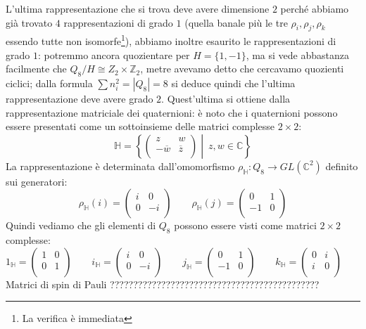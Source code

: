 \documentclass[11pt]{article}
\theoremstyle{plain}
\theoremstyle{definition}
\theoremstyle{remark}
\newcommand{\C}{\mathbb{C}}
\newcommand{\Z}{\mathbb{Z}}
\newcommand{\HH}{\mathbb{H}}
\begin{document}
L'ultima rappresentazione che si trova deve avere dimensione $2$ perché abbiamo già trovato $4$ rappresentazioni di grado $1$ (quella banale più le tre $\rho_i, \rho_j, \rho_k$ essendo tutte non isomorfe\footnote{La verifica è immediata}), abbiamo inoltre esaurito le rappresentazioni di grado $1$: potremmo ancora quozientare per $H=\{ 1, -1 \}$, ma si vede abbastanza facilmente che $Q_8/H\cong Z_2\times\Z_2$, metre avevamo detto che cercavamo quozienti ciclici; dalla formula $\sum n_i^2=|Q_8| = 8$ si deduce quindi che l'ultima rappresentazione deve avere grado $2$. Quest'ultima si ottiene dalla rappresentazione matriciale dei quaternioni: è noto che i quaternioni possono essere presentati come un sottoinsieme delle matrici complesse $2\times 2$:
\[
	\HH = \left\{ 
		\begin{pmatrix}
	              	z & w\\
	              	-\overline{w} & \overline{z}\\
	              \end{pmatrix}
	              \middle|\ z,w\in \C
		\right\}
\]
La rappresentazione è determinata dall'omomorfismo $\rho_{\HH}:Q_8\to GL(\C^2)$ definito sui generatori:
\[
	\rho_{\HH}(i) = \begin{pmatrix}
	          	i & 0\\
	          	0 & -i\\
	          \end{pmatrix}
	\qquad
	\rho_{\HH}(j) = \begin{pmatrix}
	          	0 & 1\\
	          	-1& 0\\
	          \end{pmatrix}
\]
Quindi vediamo che gli elementi di $Q_8$ possono essere visti come matrici $2\times2$ complesse:
\[ 
1_\HH = 
\left(
\begin{array}{cc}
1 & 0 \\
0 & 1 \\
\end{array}
\right)
\qquad
i_\HH = 
\left(
\begin{array}{cc}
i & 0 \\
0 & -i \\
\end{array}
\right)
\qquad
j_\HH = 
\left(
\begin{array}{cc}
0 & 1 \\
-1 & 0 \\
\end{array}
\right)
\qquad
k_\HH =
\left(
\begin{array}{cc}
0 & i \\
i & 0 \\
\end{array}
\right)
\qquad
\]
Matrici di spin di Pauli ?????????????????????????????????????????????
\end{document}
